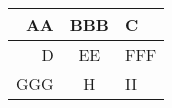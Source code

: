 \documentclass{scrartcl}
\begin{document}
\begin{table}
\centering
\begin{tabular}{|r|c|l|}
    \hline
    AA & BBB & C \\
    \hline
    D & EE & FFF \\
    GGG & H & II \\
    \hline

\end{tabular}
\end{table}
\end{document}
